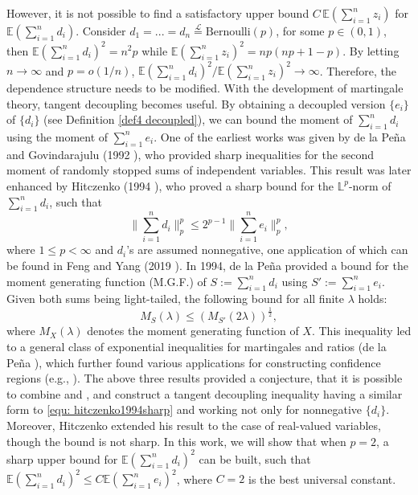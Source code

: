 \documentclass[ECP]{ejpecp} %
\newcommand{\lpar}{\left(}
\newcommand{\rpar}{\right)}
\newcommand{\lbr}{\left[}
\newcommand{\rbr}{\right]}
\newcommand{\E}{\mathbb{E}}
\newcommand{\sumn}{\sum\limits_{i=1}^n}
\begin{document}
However, it is not possible to find a satisfactory upper bound $ C \,\E  \lpar  \sumn z_i\rpar$ for $ \E  \lpar  \sumn d_i\rpar$. Consider $d_1 = ...= d_n \stackrel{\mathcal{L}}{=} \text{Bernoulli}(p)$, for some $p\in (0,1)$, then $\E(\sumn d_i)^2 = n^2 p$ while $\E(\sumn z_i)^2 = np (np+1-p)$. By letting $n \rightarrow \infty$ and $p = o(1/n)$, $\E(\sumn d_i)^2/ \E(\sumn z_i)^2 \rightarrow \infty$. Therefore, the dependence structure needs to be modified. With the development of martingale theory, tangent decoupling becomes useful. By obtaining a decoupled version $\{e_i\}$ of $\{d_i\}$ (see Definition \ref{def4 decoupled}), we can bound the moment of $\sumn d_i$ using the moment of $\sumn e_i$. One of the earliest works was given by de la Pe\~na and Govindarajulu (1992 \cite{de1992note}), who provided sharp inequalities for the second moment of randomly stopped sums of independent variables. This result was later enhanced by Hitczenko (1994 \cite{hitczenko1994sharp}), who proved a sharp bound for the $\mathbb{L}^p$-norm of $\sumn d_i$, such that 
\begin{equation}
   \label{equ: hitczenko1994sharp}
   \lVert \sumn d_i \rVert_p^p \leq2^{p-1} \lVert \sumn e_i \rVert_p^p,
\end{equation}
where $1\leq p < \infty$ and $d_i$'s are assumed nonnegative, one application of which can be found in Feng and Yang (2019 \cite{feng2019adaptive}). In 1994, de la Pe\~na \cite{de1994bound} provided a bound for the moment generating function (M.G.F.) of $S:= \sumn d_i$ using $S':= \sumn e_i$. Given both sums being light-tailed, the following bound for all finite $\lambda$ holds:
\begin{equation}
   \label{equ: de1994bound}
   M_{S}(\lambda)\leq  \lpar  M_{S'}(2\lambda) \rpar^{\frac{1}{2}}, %
\end{equation}
where $M_X(\lambda)$ denotes the moment generating function of $X$.
This inequality led to a general class of exponential inequalities for martingales and ratios (de la Pe\~na \cite{de1999general}), which further found various applications for constructing confidence regions (e.g., \cite{rakhlin2011making,nardi2011autoregressive,wang2018stochastic,ramdas2020admissible}). The above three results provided a conjecture, that it is possible to combine \cite{de1992decoupling} and \cite{hitczenko1994sharp}, and construct a tangent decoupling inequality having a similar form to \eqref{equ: hitczenko1994sharp} and working not only for nonnegative $\{d_i\}$. Moreover, Hitczenko \cite{MR1258886} extended his result \cite{hitczenko1994sharp} to the case of real-valued variables, though the bound is not sharp. In this work, we will show that when $p=2$, a sharp upper bound for $\E (\sumn d_i)^2$ can be built, such that $\E (\sumn d_i)^2 \leq C \E (\sumn e_i)^2$, where $C=2$ is the best universal constant.%
\end{document}
